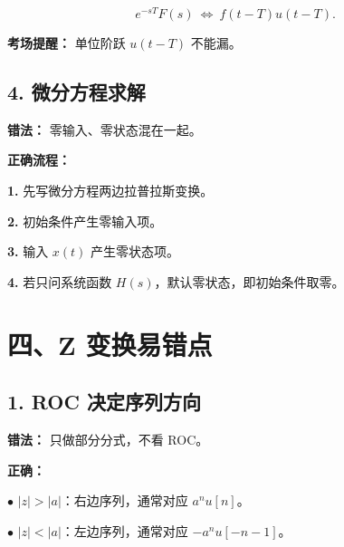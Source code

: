 \documentclass[11pt]{ctexart}
\begin{document}
\[

e^{-sT}F(s)\ \Longleftrightarrow\ f(t-T)u(t-T).

\]



\textbf{考场提醒：} 单位阶跃 \(u(t-T)\) 不能漏。\par



\subsection*{4. 微分方程求解}



\textbf{错法：} 零输入、零状态混在一起。\par



\textbf{正确流程：}\par



\noindent\textbf{1.} 先写微分方程两边拉普拉斯变换。\par

\noindent\textbf{2.} 初始条件产生零输入项。\par

\noindent\textbf{3.} 输入 \(x(t)\) 产生零状态项。\par

\noindent\textbf{4.} 若只问系统函数 \(H(s)\)，默认零状态，即初始条件取零。\par



\section*{四、Z 变换易错点}



\subsection*{1. ROC 决定序列方向}



\textbf{错法：} 只做部分分式，不看 ROC。\par



\textbf{正确：}\par



\noindent\(\bullet\) \(|z|>|a|\)：右边序列，通常对应 \(a^n u[n]\)。\par

\noindent\(\bullet\) \(|z|<|a|\)：左边序列，通常对应 \(-a^n u[-n-1]\)。\par
\end{document}
